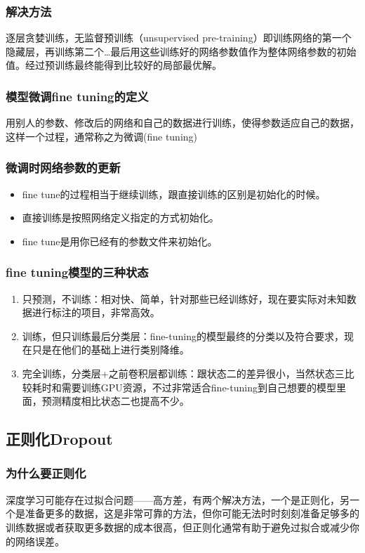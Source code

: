 \documentclass[UTF8]{ctexart}
\begin{document}
\subsubsection{解决方法}
逐层贪婪训练，无监督预训练（unsupervised pre-training）即训练网络的第一个隐藏层，再训练第二个…最后用这些训练好的网络参数值作为整体网络参数的初始值。经过预训练最终能得到比较好的局部最优解。
\subsubsection{模型微调fine tuning的定义}
用别人的参数、修改后的网络和自己的数据进行训练，使得参数适应自己的数据，这样一个过程，通常称之为微调(fine tuning)
\subsubsection{微调时网络参数的更新}
\begin{itemize}
	\item fine tune的过程相当于继续训练，跟直接训练的区别是初始化的时候。 
	\item 直接训练是按照网络定义指定的方式初始化。
	\item fine tune是用你已经有的参数文件来初始化。
\end{itemize}
\subsubsection{fine tuning模型的三种状态}
\begin{enumerate}
	\item 只预测，不训练：相对快、简单，针对那些已经训练好，现在要实际对未知数据进行标注的项目，非常高效。
	\item 训练，但只训练最后分类层：fine-tuning的模型最终的分类以及符合要求，现在只是在他们的基础上进行类别降维。
	\item 完全训练，分类层+之前卷积层都训练：跟状态二的差异很小，当然状态三比较耗时和需要训练GPU资源，不过非常适合fine-tuning到自己想要的模型里面，预测精度相比状态二也提高不少。
\end{enumerate}

\subsection{正则化Dropout}
\subsubsection{为什么要正则化}
深度学习可能存在过拟合问题——高方差，有两个解决方法，一个是正则化，另一个是准备更多的数据，这是非常可靠的方法，但你可能无法时时刻刻准备足够多的训练数据或者获取更多数据的成本很高，但正则化通常有助于避免过拟合或减少你的网络误差。 
\end{document}
